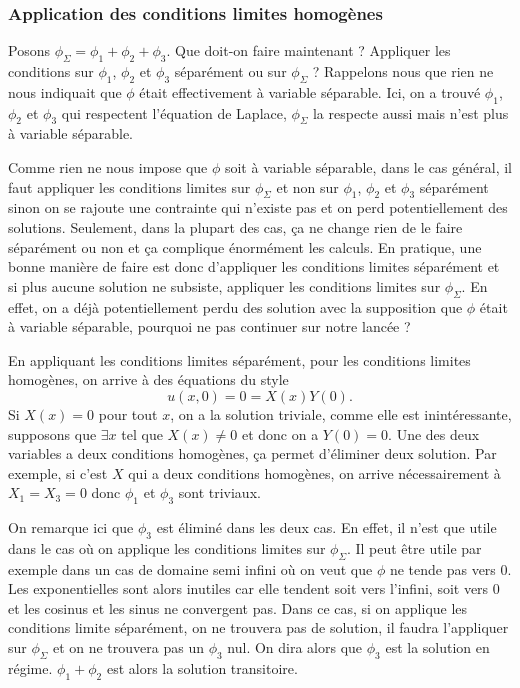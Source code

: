 \subsubsection{Application des conditions limites homogènes}
Posons $\phi_\Sigma = \phi_1 + \phi_2 + \phi_3$.
Que doit-on faire maintenant ?
Appliquer les conditions sur $\phi_1$, $\phi_2$ et $\phi_3$ séparément ou
sur $\phi_\Sigma$ ?
Rappelons nous que rien ne nous indiquait que $\phi$ était effectivement
à variable séparable.
Ici, on a trouvé $\phi_1$, $\phi_2$ et $\phi_3$ qui respectent
l'équation de Laplace, $\phi_\Sigma$ la respecte aussi mais n'est plus
à variable séparable.

Comme rien ne nous impose que $\phi$ soit à variable séparable,
dans le cas général, il faut appliquer les conditions limites sur
$\phi_\Sigma$ et non sur $\phi_1$, $\phi_2$ et $\phi_3$ séparément sinon
on se rajoute une contrainte qui n'existe pas et on perd potentiellement
des solutions.
Seulement, dans la plupart des cas, ça ne change rien
de le faire séparément ou non et ça complique énormément les calculs.
En pratique, une bonne manière de faire est donc d'appliquer
les conditions limites séparément et si plus aucune solution
ne subsiste, appliquer les conditions limites sur $\phi_\Sigma$.
En effet, on a déjà potentiellement perdu des solution avec la supposition
que $\phi$ était à variable séparable, pourquoi ne pas continuer
sur notre lancée ?

En appliquant les conditions limites séparément,
pour les conditions limites homogènes,
on arrive à des équations du style
\[ u(x, 0) = 0 = X(x)Y(0). \]
Si $X(x) = 0$ pour tout $x$, on a la solution triviale, comme elle
est inintéressante, supposons que $\exists x$ tel que $X(x) \neq 0$ et donc
on a $Y(0) = 0$.
Une des deux variables a deux conditions homogènes,
ça permet d'éliminer deux solution.
Par exemple, si c'est $X$ qui a deux conditions homogènes,
on arrive nécessairement à $X_1 = X_3 = 0$
donc $\phi_1$ et $\phi_3$ sont triviaux.

On remarque ici que $\phi_3$ est éliminé dans les deux cas.
En effet, il n'est que utile dans le cas où on applique
les conditions limites sur $\phi_\Sigma$.
Il peut être utile par exemple dans un cas de domaine semi infini où
on veut que $\phi$ ne tende pas vers 0.
Les exponentielles sont alors inutiles car elle tendent
soit vers l'infini, soit vers 0
et les cosinus et les sinus ne convergent pas.
Dans ce cas, si on applique les conditions limite séparément,
on ne trouvera pas de solution, il faudra
l'appliquer sur $\phi_\Sigma$ et on ne trouvera pas un $\phi_3$ nul.
On dira alors que $\phi_3$ est la solution en régime.
$\phi_1 + \phi_2$ est alors la solution transitoire.

